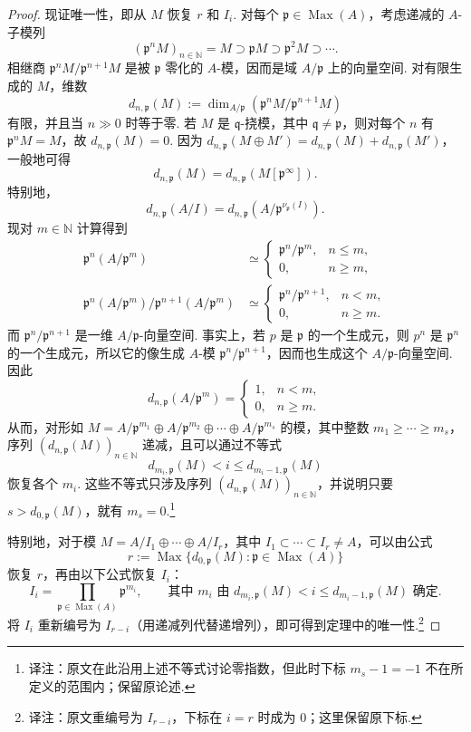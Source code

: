 \begin{proof}
现证唯一性，即从 $M$ 恢复 $r$ 和 $I_i$. 对每个 $\mathfrak p\in\operatorname{Max}(A)$，考虑递减的 $A$-子模列
\[(\mathfrak p^nM)_{n\in\mathbb N}=M\supset\mathfrak pM\supset\mathfrak p^2M\supset\cdots.\]
相继商 $\mathfrak p^nM/\mathfrak p^{n+1}M$ 是被 $\mathfrak p$ 零化的 $A$-模，因而是域 $A/\mathfrak p$ 上的向量空间. 对有限生成的 $M$，维数
\[d_{n,\mathfrak p}(M):=\dim_{A/\mathfrak p}(\mathfrak p^nM/\mathfrak p^{n+1}M)\]
有限，并且当 $n\gg0$ 时等于零. 若 $M$ 是 $\mathfrak q$-挠模，其中 $\mathfrak q\ne\mathfrak p$，则对每个 $n$ 有 $\mathfrak p^nM=M$，故 $d_{n,\mathfrak p}(M)=0$. 因为 $d_{n,\mathfrak p}(M\oplus M')=d_{n,\mathfrak p}(M)+d_{n,\mathfrak p}(M')$，一般地可得
\[d_{n,\mathfrak p}(M)=d_{n,\mathfrak p}(M[\mathfrak p^\infty]).\]
特别地，
\[d_{n,\mathfrak p}(A/I)=d_{n,\mathfrak p}(A/\mathfrak p^{\nu_{\mathfrak p}(I)}).\]
现对 $m\in\mathbb N$ 计算得到
\begin{align*}
\mathfrak p^n(A/\mathfrak p^m)&\simeq\begin{cases}\mathfrak p^n/\mathfrak p^m,&n\le m,\\0,&n\ge m,\end{cases}\\
\mathfrak p^n(A/\mathfrak p^m)/\mathfrak p^{n+1}(A/\mathfrak p^m)&\simeq\begin{cases}\mathfrak p^n/\mathfrak p^{n+1},&n<m,\\0,&n\ge m.\end{cases}
\end{align*}
而 $\mathfrak p^n/\mathfrak p^{n+1}$ 是一维 $A/\mathfrak p$-向量空间. 事实上，若 $p$ 是 $\mathfrak p$ 的一个生成元，则 $p^n$ 是 $\mathfrak p^n$ 的一个生成元，所以它的像生成 $A$-模 $\mathfrak p^n/\mathfrak p^{n+1}$，因而也生成这个 $A/\mathfrak p$-向量空间. 因此
\[d_{n,\mathfrak p}(A/\mathfrak p^m)=\begin{cases}1,&n<m,\\0,&n\ge m.\end{cases}\]
从而，对形如 $M=A/\mathfrak p^{m_1}\oplus A/\mathfrak p^{m_2}\oplus\cdots\oplus A/\mathfrak p^{m_s}$ 的模，其中整数 $m_1\ge\cdots\ge m_s$，序列 $(d_{n,\mathfrak p}(M))_{n\in\mathbb N}$ 递减，且可以通过不等式
\[d_{m_i,\mathfrak p}(M)<i\le d_{m_i-1,\mathfrak p}(M)\]
恢复各个 $m_i$. 这些不等式只涉及序列 $(d_{n,\mathfrak p}(M))_{n\in\mathbb N}$，并说明只要 $s>d_{0,\mathfrak p}(M)$，就有 $m_s=0$.\footnote{译注：原文在此沿用上述不等式讨论零指数，但此时下标 $m_s-1=-1$ 不在所定义的范围内；保留原论述.}

特别地，对于模 $M=A/I_1\oplus\cdots\oplus A/I_r$，其中 $I_1\subset\cdots\subset I_r\ne A$，可以由公式
\[r:=\operatorname{Max}\{d_{0,\mathfrak p}(M):\mathfrak p\in\operatorname{Max}(A)\}\]
恢复 $r$，再由以下公式恢复 $I_i$：
\[I_i=\prod_{\mathfrak p\in\operatorname{Max}(A)}\mathfrak p^{m_i},\qquad
\text{其中 $m_i$ 由 }d_{m_i,\mathfrak p}(M)<i\le d_{m_i-1,\mathfrak p}(M)\text{ 确定}.\]
将 $I_i$ 重新编号为 $I_{r-i}$（用递减列代替递增列），即可得到定理中的唯一性.\footnote{译注：原文重编号为 $I_{r-i}$，下标在 $i=r$ 时成为 $0$；这里保留原下标.}
\end{proof}
